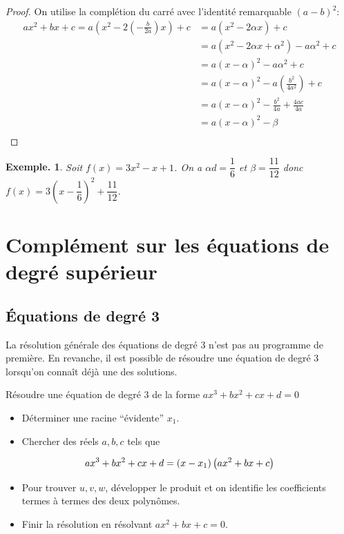 \documentclass[12pt]{article}
\theoremstyle{break}
\newtheorem*{example}{Exemple.}
\begin{document}
\begin{proof}
  On utilise la complétion du carré avec l'identité remarquable $(a-b)^2$:
  \begin{align*}
    ax^2 + bx + c = %
    a\left(x^2 - 2\left(-\frac{b}{2a}\right)x\right) + c
    &= a\left(x^2 - 2\alpha x\right) + c\\
    &= a\left(x^2 - 2\alpha x + \alpha^2\right) - a\alpha^2 + c\\
    &= a\left(x-\alpha\right)^2 - a\alpha^2 + c\\
    &= a\left(x-\alpha\right)^2 - a\left(\frac{b^2}{4a^2}\right)+ c\\
    &= a\left(x-\alpha\right)^2 - \frac{b^2}{4a} + \frac{4ac}{4a}\\
    &= a\left(x-\alpha\right)^2 - \beta\\
  \end{align*}
\end{proof}

\begin{example}
  Soit $f(x) = 3x^2 -x + 1$. On a $\alpha d= \dfrac{1}{6}$ et $\beta = \dfrac{11}{12}$ donc $f(x) = 3\left(x - \dfrac{1}{6}\right)^2 + \dfrac{11}{12}$.
\end{example}


\section{Complément sur les équations de degré supérieur}
\subsection{Équations de degré 3}
La résolution générale des équations de degré 3 n'est pas au programme de première. En revanche, il est possible de résoudre une équation de degré 3 lorsqu'on connaît déjà une des solutions.

\begin{method}{Résoudre une équation de degré 3 de la forme $a x^{3}+b x^{2}+c x+d=0$}{}
    
\begin{itemize}
  \item Déterminer une racine ``évidente'' $x_{1}$.
  \item Chercher des réels $a, b, c$ tels que
\end{itemize}

$$
a x^{3}+b x^{2}+c x+d=\left(x-x_{1}\right)\left(a x^{2}+b x+c\right)
$$

\begin{itemize}
  \item Pour trouver $u, v, w$, développer le produit et on identifie les coefficients termes à termes des deux polynômes.
  \item Finir la résolution en résolvant $a x^{2}+b x+c=0$.
\end{itemize}
\end{method}
\end{document}
